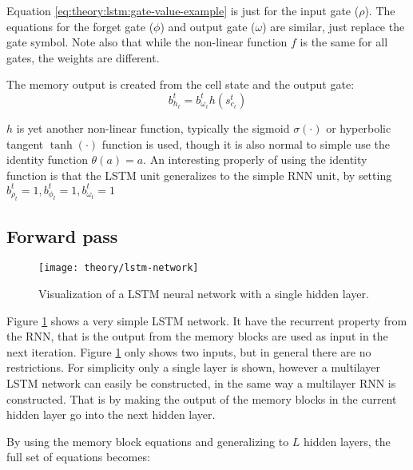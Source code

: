 Equation \eqref{eq:theory:lstm:gate-value-example} is just for the input gate ($\rho$). The equations for the forget gate ($\phi$) and output gate ($\omega$) are similar, just replace the gate symbol. Note also that while the non-linear function $f$ is the same for all gates, the weights are different.

The memory output is created from the cell state and the output gate:
\begin{equation}
b_{h_\ell}^t = b_{\omega_\ell}^t h(s_{c_\ell}^t)
\end{equation}

$h$ is yet another non-linear function, typically the sigmoid $\sigma(\cdot)$ or hyperbolic tangent $\tanh(\cdot)$ function is used, though it is also normal to simple use the identity function $\theta(a) = a$. An interesting properly of using the identity function is that the LSTM unit generalizes to the simple RNN unit, by setting $b_{\rho_t}^t = 1, b_{\phi_t}^t = 1, b_{\omega_t}^t = 1$

\newpage
\subsection{Forward pass}

\begin{figure}[h]
	\centering
	\centerline{\texttt{[image: theory/lstm-network]}}
	\caption{Visualization of a LSTM neural network with a single hidden layer.}
	\label{fig:theory:lstm:lstm-network}
\end{figure}

Figure \ref{fig:theory:lstm:lstm-network} shows a very simple LSTM network. It have the recurrent property from the RNN, that is the output from the memory blocks are used as input in the next iteration. Figure \ref{fig:theory:lstm:lstm-network} only shows two inputs, but in general there are no restrictions. For simplicity only a single layer is shown, however a multilayer LSTM network can easily be constructed, in the same way a multilayer RNN is constructed. That is by making the output of the memory blocks in the current hidden layer go into the next hidden layer. 

By using the memory block equations and generalizing to $L$ hidden layers, the full set of equations becomes:

